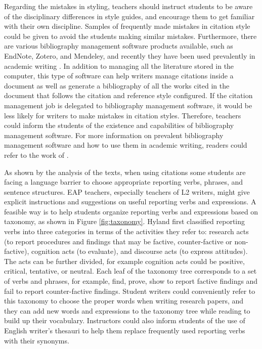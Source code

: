Regarding the mistakes in styling, teachers should instruct students to be aware of the disciplinary differences in style guides, and encourage them to get familiar with their own discipline. Samples of frequently made mistakes in citation style could be given to avoid the students making similar mistakes. Furthermore, there are various bibliography management software products available, such as EndNote, Zotero, and Mendeley, and recently they have been used prevalently in academic writing \citep{cuschieri_wasp_2019}. In addition to managing all the literature stored in the computer, this type of software can help writers manage citations inside a document as well as generate a bibliography of all the works cited in the document that follows the citation and reference style configured. If the citation management job is delegated to bibliography management software, it would be less likely for writers to make mistakes in citation styles. Therefore, teachers could inform the students of the existence and capabilities of bibliography management software. For more information on prevalent bibliography management software and how to use them in academic writing, readers could refer to the work of \citet{cuschieri_wasp_2019}.

As shown by the analysis of the texts, when using citations some students are facing a language barrier to choose appropriate reporting verbs, phrases, and sentence structures. EAP teachers, especially teachers of L2 writers, might give explicit instructions and suggestions on useful reporting verbs and expressions. A feasible way is to help students organize reporting verbs and expressions based on  taxonomy, as shown in Figure \ref{fig:taxonomy}. Hyland first classified reporting verbs into three categories in terms of the activities they refer to: research acts (to report procedures and findings that may be factive, counter-factive or non-factive), cognition acts (to evaluate), and discourse acts (to express attitudes). The acts can be further divided, for example cognition acts could be positive, critical, tentative, or neutral. Each leaf of the taxonomy tree corresponds to a set of verbs and phrases, for example, find, prove, show to report factive findings and fail to report counter-factive findings. Student writers could conveniently refer to this taxonomy to choose the proper words when writing research papers, and they can add new words and expressions to the taxonomy tree while reading to build up their vocabulary. Instructors could also inform students of the use of English writer’s thesauri to help them replace frequently used reporting verbs with their synonyms.

